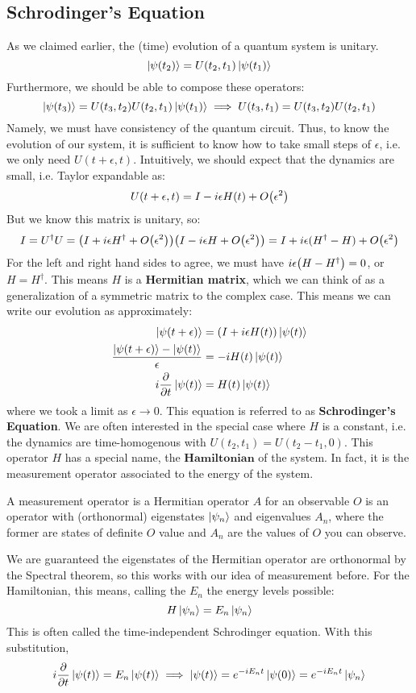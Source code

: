 \subsection{Schrodinger's Equation}
As we claimed earlier, the (time) evolution of a quantum system is unitary.
\[ \ket{\psi(t_2)} = U(t_2, t_1) \ket{\psi(t_1)} \]
Furthermore, we should be able to compose these operators:
\[ \ket{\psi(t_3)} = U(t_3, t_2) U(t_2, t_1) \ket{\psi(t_1)} \implies U(t_3, t_1) = U(t_3, t_2) U(t_2, t_1) \]
Namely, we must have consistency of the quantum circuit. Thus, to know the evolution of our system, it is sufficient to know
how to take small steps of $\epsilon$, i.e. we only need $U(t + \epsilon, t)$. Intuitively, we should expect that the dynamics are small, i.e.
Taylor expandable as:
\[ U(t + \epsilon, t) = I - i\epsilon H(t) + O\qty(\epsilon^2) \]
But we know this matrix is unitary, so:
\[ I = U^{\dagger} U = \qty(I + i\epsilon H^{\dagger} + O\qty(\epsilon^2))\qty(I - i \epsilon H + O\qty(\epsilon^2)) = I + i \epsilon (H^{\dagger} - H) + O\qty(\epsilon^2) \]
For the left and right hand sides to agree, we must have $ i \epsilon \qty(H - H^{\dagger}) = 0$, or $H = H^{\dagger}$. This means $H$ is a \textbf{Hermitian matrix}, which
we can think of as a generalization of a symmetric matrix to the complex case. This means we can write our evolution as approximately:
\begin{align*}
    \ket{\psi(t + \epsilon)} &= (I + i\epsilon H(t)) \ket{\psi(t)} \\
    \frac{\ket{\psi(t + \epsilon)} - \ket{\psi(t)}}{\epsilon} &= - i H(t) \ket{\psi(t)} \\
    i \pdv{}{t} \ket{\psi(t)} &= H(t) \ket{\psi(t)}
\end{align*}
where we took a limit as $\epsilon \to 0$. This equation is referred to as \textbf{Schrodinger's Equation}. We are often
interested in the special case where $H$ is a constant, i.e. the dynamics are time-homogenous with $U(t_2, t_1) = U(t_2 - t_1, 0)$.
This operator $H$ has a special name, the $\textbf{Hamiltonian}$ of the system. In fact, it is the measurement operator associated to the energy of the system.
\begin{definition}
    A measurement operator is a Hermitian operator $A$ for an observable $O$ is an operator
    with (orthonormal) eigenstates $\ket{\psi_n}$ and eigenvalues $A_n$, where the former are states of definite $O$ value and $A_n$ are the values
    of $O$ you can observe.
\end{definition}
We are guaranteed the eigenstates of the Hermitian operator are orthonormal by the Spectral theorem, so this works with our idea of measurement before.
For the Hamiltonian, this means, calling the $E_n$ the energy levels possible:
\[ H \ket{\psi_n} = E_n \ket{\psi_n} \]
This is often called the time-independent Schrodinger equation. With this substitution,
\[ i \pdv{}{t} \ket{\psi(t)} = E_n \ket{\psi(t)} \implies \ket{\psi(t)} = e^{-i E_n t} \ket{\psi(0)} = e^{-i E_n t} \ket{\psi_n} \]

